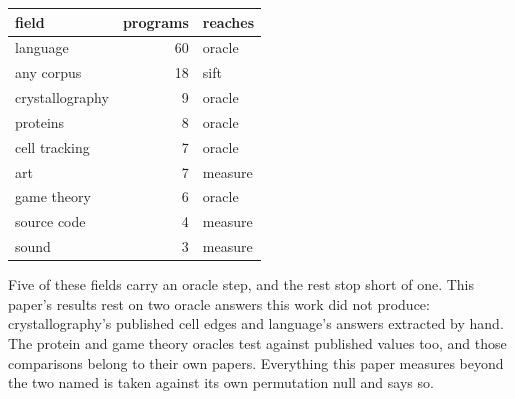 \begin{center}
\begin{tabular}{@{}>{\raggedright\arraybackslash}p{}rl@{}}
\toprule
field & programs & reaches \\
\midrule
language        & 60 & oracle \\
any corpus      & 18 & sift \\
crystallography &  9 & oracle \\
proteins        &  8 & oracle \\
cell tracking   &  7 & oracle \\
art             &  7 & measure \\
game theory     &  6 & oracle \\
source code     &  4 & measure \\
sound           &  3 & measure \\
\bottomrule
\end{tabular}
\end{center}

Five of these fields carry an oracle step, and the rest stop short of one. This paper's results
rest on two oracle answers this work did not produce: crystallography's published cell edges \cite{src:Crystallography-Open-Database} and
language's answers extracted by hand. The protein and game theory oracles test against published
values too, and those comparisons belong to their own papers. Everything this paper measures beyond
the two named is taken against its own permutation null and says so.

